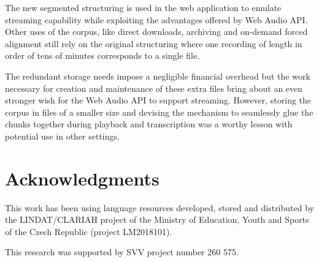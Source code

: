 \documentclass[conference]{IEEEtran}
\begin{document}
The new segmented structuring is used in the web application to emulate
streaming capability while exploiting the advantages offered by Web Audio API.
Other uses of the corpus, like direct downloads, archiving and on-demand forced
alignment still rely on the original structuring where one recording of length
in order of tens of minutes corresponds to a single file.

The redundant storage needs impose a negligible financial overhead but the work
necessary for creation and maintenance of these extra files bring about an even
stronger wish for the Web Audio API to support streaming. However, storing the
corpus in files of a smaller size and devising the mechanism to seamlessly glue
the chunks together during playback and transcription was a worthy lesson with
potential use in other settings.

\section*{Acknowledgments}

This work has been using language resources developed, stored and distributed by
the LINDAT/CLARIAH project of the Ministry of Education, Youth and Sports of the
Czech Republic (project LM2018101).

This research was supported by SVV project number 260 575.



\end{document}
